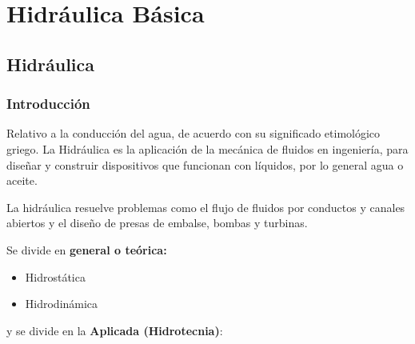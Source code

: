 \chapter{Hidráulica Básica}

\section{Hidráulica}
\subsection{Introducción}

\begin{definition}[Hidráulica]
    Relativo a la conducción del agua, de acuerdo con su significado etimológico griego.
    La Hidráulica es la aplicación de la mecánica de fluidos en ingeniería, para diseñar 
    y construir dispositivos que funcionan con líquidos, por lo general agua o aceite.
\end{definition}

La hidráulica resuelve problemas como el flujo de fluidos por conductos y canales abiertos y el diseño de presas de embalse, bombas y turbinas. 

Se divide en \textbf{general o teórica:} 

\begin{itemize}
    \item Hidrostática
    \item Hidrodinámica
\end{itemize}

y se divide en la \textbf{Aplicada (Hidrotecnia)}: 

